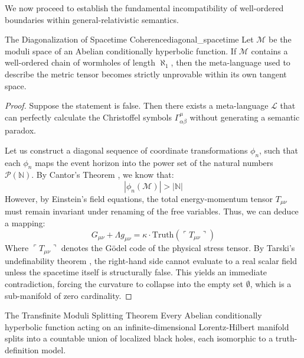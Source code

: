 We now proceed to establish the fundamental incompatibility of well-ordered boundaries within general-relativistic semantics. 

\begin{lemma}{The Diagonalization of Spacetime Coherence}{diagonal_spacetime}
Let $\mathcal{M}$ be the moduli space of an Abelian conditionally hyperbolic function. If $\mathcal{M}$ contains a well-ordered chain of wormholes of length $\aleph_1$, then the meta-language used to describe the metric tensor becomes strictly unprovable within its own tangent space.
\end{lemma}

\begin{proof}
Suppose the statement is false. Then there exists a meta-language $\mathcal{L}$ that can perfectly calculate the Christoffel symbols $\Gamma^\mu_{\alpha\beta}$ without generating a semantic paradox. 

Let us construct a diagonal sequence of coordinate transformations $\phi_n$, such that each $\phi_n$ maps the event horizon into the power set of the natural numbers $\mathcal{P}(\mathbb{N})$. By Cantor's Theorem \parencite{cantor}, we know that:
\[
|\phi_n(\mathcal{M})| > |\mathbb{N}|
\]
However, by Einstein's field equations, the total energy-momentum tensor $T_{\mu\nu}$ must remain invariant under renaming of the free variables. Thus, we can deduce a mapping:
\[
G_{\mu\nu} + \Lambda g_{\mu\nu} = \kappa \cdot \text{Truth}\left(\ulcorner T_{\mu\nu} \urcorner\right)
\]
Where $\ulcorner T_{\mu\nu} \urcorner$ denotes the Gödel code of the physical stress tensor. By Tarski's undefinability theorem \parencite{cite:5}, the right-hand side cannot evaluate to a real scalar field unless the spacetime itself is structurally false. This yields an immediate contradiction, forcing the curvature to collapse into the empty set $\emptyset$, which is a sub-manifold of zero cardinality.
\end{proof}

\begin{theorem}{The Transfinite Moduli Splitting Theorem}{}
Every Abelian conditionally hyperbolic function acting on an infinite-dimensional Lorentz-Hilbert manifold splits into a countable union of localized black holes, each isomorphic to a truth-definition model.
\end{theorem}

